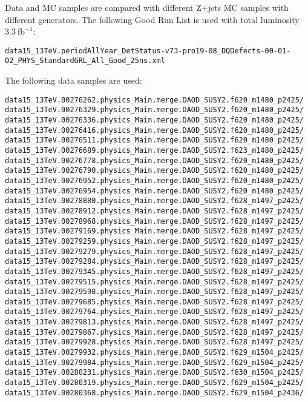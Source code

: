 Data and MC samples are compared with different Z+jets MC samples with different generators.
The following Good Run List is used with total luminosity $3.3~\text{fb}^{-1}$:
\small
\begin{verbatim}
data15_13TeV.periodAllYear_DetStatus-v73-pro19-08_DQDefects-00-01-02_PHYS_StandardGRL_All_Good_25ns.xml
\end{verbatim}
\normalsize

The following data samples are used:
\small
\begin{verbatim}
data15_13TeV.00276262.physics_Main.merge.DAOD_SUSY2.f620_m1480_p2425/
data15_13TeV.00276329.physics_Main.merge.DAOD_SUSY2.f620_m1480_p2425/
data15_13TeV.00276336.physics_Main.merge.DAOD_SUSY2.f620_m1480_p2425/
data15_13TeV.00276416.physics_Main.merge.DAOD_SUSY2.f620_m1480_p2425/
data15_13TeV.00276511.physics_Main.merge.DAOD_SUSY2.f620_m1480_p2425/
data15_13TeV.00276689.physics_Main.merge.DAOD_SUSY2.f623_m1480_p2425/
data15_13TeV.00276778.physics_Main.merge.DAOD_SUSY2.f620_m1480_p2425/
data15_13TeV.00276790.physics_Main.merge.DAOD_SUSY2.f620_m1480_p2425/
data15_13TeV.00276952.physics_Main.merge.DAOD_SUSY2.f620_m1480_p2425/
data15_13TeV.00276954.physics_Main.merge.DAOD_SUSY2.f620_m1480_p2425/
data15_13TeV.00278880.physics_Main.merge.DAOD_SUSY2.f628_m1497_p2425/
data15_13TeV.00278912.physics_Main.merge.DAOD_SUSY2.f628_m1497_p2425/
data15_13TeV.00278968.physics_Main.merge.DAOD_SUSY2.f628_m1497_p2425/
data15_13TeV.00279169.physics_Main.merge.DAOD_SUSY2.f628_m1497_p2425/
data15_13TeV.00279259.physics_Main.merge.DAOD_SUSY2.f628_m1497_p2425/
data15_13TeV.00279279.physics_Main.merge.DAOD_SUSY2.f628_m1497_p2425/
data15_13TeV.00279284.physics_Main.merge.DAOD_SUSY2.f628_m1497_p2425/
data15_13TeV.00279345.physics_Main.merge.DAOD_SUSY2.f628_m1497_p2425/
data15_13TeV.00279515.physics_Main.merge.DAOD_SUSY2.f628_m1497_p2425/
data15_13TeV.00279598.physics_Main.merge.DAOD_SUSY2.f628_m1497_p2425/
data15_13TeV.00279685.physics_Main.merge.DAOD_SUSY2.f628_m1497_p2425/
data15_13TeV.00279764.physics_Main.merge.DAOD_SUSY2.f628_m1497_p2425/
data15_13TeV.00279813.physics_Main.merge.DAOD_SUSY2.f628_m1497_p2425/
data15_13TeV.00279867.physics_Main.merge.DAOD_SUSY2.f628_m1497_p2425/
data15_13TeV.00279928.physics_Main.merge.DAOD_SUSY2.f628_m1497_p2425/
data15_13TeV.00279932.physics_Main.merge.DAOD_SUSY2.f629_m1504_p2425/
data15_13TeV.00279984.physics_Main.merge.DAOD_SUSY2.f629_m1504_p2425/
data15_13TeV.00280231.physics_Main.merge.DAOD_SUSY2.f630_m1504_p2425/
data15_13TeV.00280319.physics_Main.merge.DAOD_SUSY2.f629_m1504_p2425/
data15_13TeV.00280368.physics_Main.merge.DAOD_SUSY2.f629_m1504_p2436/

\end{verbatim}
